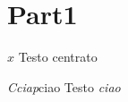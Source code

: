 \documentclass[border=10pt]{book}
\begin{document}
\part{Part1}
\begin{center}
$x$
Testo centrato
\end{center}
\emph{Cciap}ciao
Testo
\emph{ciao}
\end{document}
